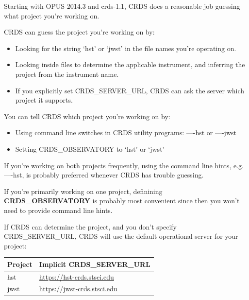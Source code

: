 \documentclass[letterpaper,10pt,english]{sphinxmanual}
\begin{document}
Starting with OPUS 2014.3 and crds-1.1,  CRDS does a reasonable job guessing what project you're working on.

CRDS can guess the project you're working on by:
\begin{itemize}
\item {} 
Looking for the string `hst' or `jwst' in the file names you're operating on.

\item {} 
Looking inside files to determine the applicable instrument, and inferring the project from the instrument name.

\item {} 
If you explicitly set CRDS\_SERVER\_URL,  CRDS can ask the server which project it supports.

\end{itemize}

You can tell CRDS which project you're working on by:
\begin{itemize}
\item {} 
Using command line switches in CRDS utility programs:  ----hst or ----jwst

\item {} 
Setting CRDS\_OBSERVATORY to `hst' or `jwst'

\end{itemize}

If you're working on both projects frequently,  using the command line hints,  e.g. ----hst,  is probably
preferred whenever CRDS has trouble guessing.

If you're primarily working on one project,  definining \textbf{CRDS\_OBSERVATORY} is probably most convenient
since then you won't need to provide command line hints.

If CRDS can determine the project,  and you don't specify CRDS\_SERVER\_URL,  CRDS will use the default
operational server for your project:

\begin{tabulary}{\linewidth}{|L|L|}
\hline
\textbf{
Project
} & \textbf{
Implicit CRDS\_SERVER\_URL
}\\\hline

hst
 & 
\href{https://hst-crds.stsci.edu}{https://hst-crds.stsci.edu}
\\\hline

jwst
 & 
\href{https://jwst-crds.stsci.edu}{https://jwst-crds.stsci.edu}
\\\hline
\end{tabulary}
\end{document}
